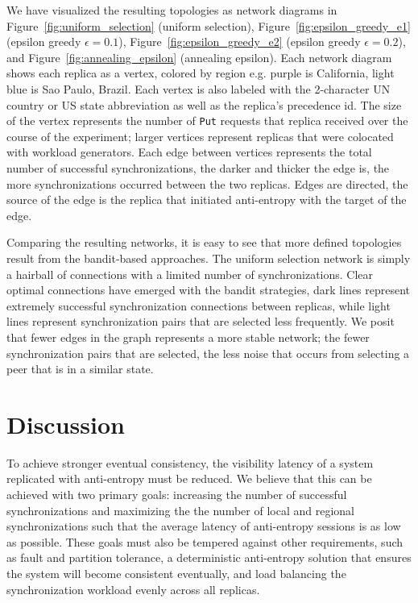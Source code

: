 We have visualized the resulting topologies as network diagrams in
Figure~\ref{fig:uniform_selection} (uniform selection),
Figure~\ref{fig:epsilon_greedy_e1} (epsilon greedy $\epsilon=0.1$),
Figure~\ref{fig:epsilon_greedy_e2} (epsilon greedy $\epsilon=0.2$), and
Figure~\ref{fig:annealing_epsilon} (annealing epsilon).
Each network diagram shows each replica as a vertex, colored by region e.g.
purple is California, light blue is Sao Paulo, Brazil.
Each vertex is also labeled with the 2-character UN country or US state
abbreviation as well as the replica's precedence id.
The size of the vertex represents the number of \texttt{Put} requests that
replica received over the course of the experiment; larger vertices
represent replicas that were colocated with workload generators.
Each edge between vertices represents the total number of successful
synchronizations, the darker and thicker the edge is, the more
synchronizations occurred between the two replicas.
Edges are directed, the source of the edge is the replica that initiated
anti-entropy with the target of the edge.

Comparing the resulting networks, it is easy to see that more defined
topologies result from the bandit-based approaches.
The uniform selection network is simply a hairball of connections with
a limited number of synchronizations.
Clear optimal connections have emerged with the bandit strategies, dark
lines represent extremely successful synchronization connections between
replicas, while light lines represent synchronization pairs that are
selected less frequently.
We posit that fewer edges in the graph represents a more stable network;
the fewer synchronization pairs that are selected, the less noise that
occurs from selecting a peer that is in a similar state.

\section*{Discussion}

To achieve stronger eventual consistency, the visibility latency
of a system replicated with anti-entropy must be reduced.
We believe that this can be achieved with two primary goals: increasing
the number of successful synchronizations and maximizing the the number
of local and regional synchronizations such that the average latency of
anti-entropy sessions is as low as possible.
These goals must also be tempered against other requirements, such as
fault and partition tolerance, a deterministic anti-entropy solution that
ensures the system will become consistent eventually, and load balancing
the synchronization workload evenly across all replicas.

